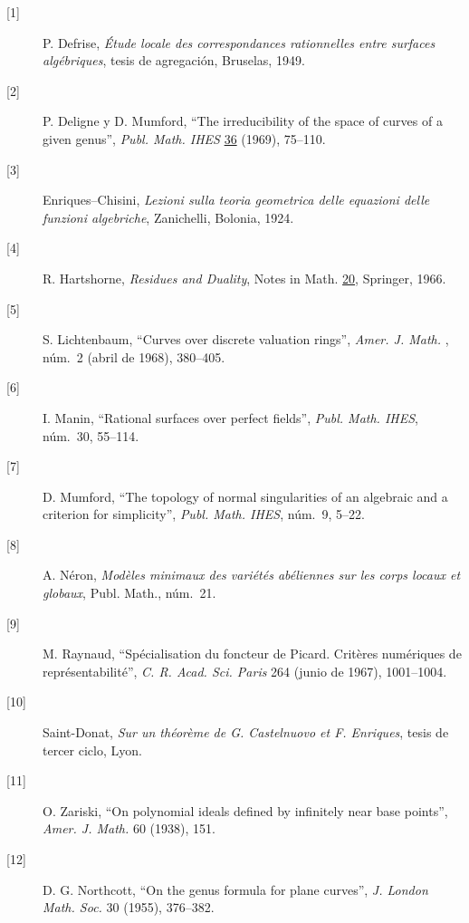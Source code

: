 \begin{description}
\item[{[1]}] P. Defrise, \textit{Étude locale des correspondances rationnelles
entre surfaces algébriques}, tesis de agregación, Bruselas, 1949.

\item[{[2]}] P. Deligne y D. Mumford, ``The irreducibility of the space of
curves of a given genus'', \textit{Publ. Math. IHES} \underline{36} (1969),
75--110.

\item[{[3]}] Enriques--Chisini, \textit{Lezioni sulla teoria geometrica delle
equazioni  delle funzioni algebriche}, Zanichelli, Bolonia, 1924.

\item[{[4]}] R. Hartshorne, \textit{Residues and Duality},
 Notes in Math. \underline{20},
Springer, 1966.

\item[{[5]}] S. Lichtenbaum, ``Curves over discrete valuation rings'',
\textit{Amer. J. Math.} , núm.~2 (abril de 1968), 380--405.

\item[{[6]}] I. Manin, ``Rational surfaces over perfect fields'',
\textit{Publ. Math. IHES}, núm.~30, 55--114.

\item[{[7]}] D. Mumford, ``The topology of normal singularities of an algebraic
 and a criterion for simplicity'',
\textit{Publ. Math. IHES}, núm.~9, 5--22.

\item[{[8]}] A. Néron, \textit{Modèles minimaux des variétés abéliennes sur
les corps locaux et globaux}, Publ. Math., núm.~21.

\pageoriginale

\item[{[9]}] M. Raynaud, ``Spécialisation du foncteur de Picard. Critères
numériques de représentabilité'', \textit{C. R. Acad. Sci. Paris} 264
(junio de 1967), 1001--1004.

\item[{[10]}] Saint-Donat, \textit{Sur un théorème de G. Castelnuovo et
F. Enriques}, tesis de tercer ciclo, Lyon.

\item[{[11]}] O. Zariski, ``On polynomial ideals defined by infinitely near
base points\sisi{}{,}'', \textit{Amer. J. Math.} 60 (1938), 151.

\item[{[12]}] D. G. Northcott, ``On the genus formula for plane curves'',
\textit{J. London Math. Soc.} 30 (1955), 376--382.


\end{description}
